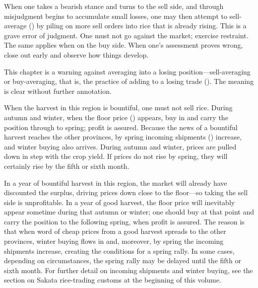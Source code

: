
\begin{sokyubox}
{\small\itshape\color{sokyubar} }

\medskip
When one takes a bearish stance and turns to the sell side, and through
misjudgment begins to accumulate small losses, one may then attempt to
sell-average () by piling on more sell orders
into rice that is already rising. This is a grave error of judgment. One
must not go against the market; exercise restraint. The same applies
when on the buy side. When one's assessment proves wrong, close out
early and observe how things develop.
\end{sokyubox}

\commentary
This chapter is a warning against averaging into a losing position---sell-averaging
or buy-averaging, that is, the practice of adding to a losing trade
(). The meaning is clear without further
annotation.


\begin{sokyubox}
{\small\itshape\color{sokyubar} }

\medskip
When the harvest in this region is bountiful, one must not sell rice.
During autumn and winter, when the floor price ()
appears, buy in and carry the position through to spring; profit is
assured. Because the news of a bountiful harvest reaches the other
provinces, by spring incoming shipments () increase,
and winter buying also arrives. During autumn and winter, prices are
pulled down in step with the crop yield. If prices do not rise by
spring, they will certainly rise by the fifth or sixth month.
\end{sokyubox}

\commentary
In a year of bountiful harvest in this region, the market will already
have discounted the surplus, driving prices down close to the
floor---so taking the sell side is unprofitable. In
a year of good harvest, the floor price will inevitably appear sometime
during that autumn or winter; one should buy at that point and carry the
position to the following spring, when profit is assured. The reason is
that when word of cheap prices from a good harvest spreads to the other
provinces, winter buying flows in and, moreover, by spring the incoming
shipments increase, creating the conditions for a spring rally. In some
cases, depending on circumstances, the spring rally may be delayed until
the fifth or sixth month. For further detail on incoming shipments and
winter buying, see the section on Sakata rice-trading customs at the
beginning of this volume.


